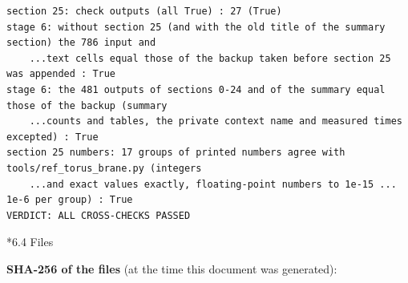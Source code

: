 \documentclass[10pt,a4paper]{article}
\makeatletter
\renewcommand\subsection{\@startsection{subsection}{2}{\z@}{-3.25ex\@plus -1ex \@minus -.2ex}{1.5ex \@plus .2ex}{\normalfont\large\bfseries\raggedright}}
\makeatother
\begin{document}
\begin{Verbatim}[fontsize=\small,frame=single,framesep=2mm]
section 25: check outputs (all True) : 27 (True)
stage 6: without section 25 (and with the old title of the summary section) the 786 input and
    ...text cells equal those of the backup taken before section 25 was appended : True
stage 6: the 481 outputs of sections 0-24 and of the summary equal those of the backup (summary
    ...counts and tables, the private context name and measured times excepted) : True
section 25 numbers: 17 groups of printed numbers agree with tools/ref_torus_brane.py (integers
    ...and exact values exactly, floating-point numbers to 1e-15 ... 1e-6 per group) : True
VERDICT: ALL CROSS-CHECKS PASSED
\end{Verbatim}
\subsection*{6.4 Files}
\textbf{SHA-256 of the files} (at the time this document was generated):
\end{document}

